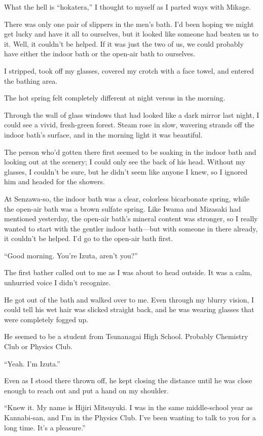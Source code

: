 \documentclass[
    a4paper,
    12pt,
    twoside,
    openany,
    UTF8,
    fontset=windows
]{ctexbook}
\begin{document}
What the hell is ``hokatera,'' I thought to myself as I parted ways with Mikage.

There was only one pair of slippers in the men's bath. I'd been hoping we might get lucky and have it all to ourselves, but it looked like someone had beaten us to it. Well, it couldn't be helped. If it was just the two of us, we could probably have either the indoor bath or the open-air bath to ourselves.

I stripped, took off my glasses, covered my crotch with a face towel, and entered the bathing area.

The hot spring felt completely different at night versus in the morning.

Through the wall of glass windows that had looked like a dark mirror last night, I could see a vivid, fresh-green forest. Steam rose in slow, wavering strands off the indoor bath's surface, and in the morning light it was beautiful.

The person who'd gotten there first seemed to be soaking in the indoor bath and looking out at the scenery; I could only see the back of his head. Without my glasses, I couldn't be sure, but he didn't seem like anyone I knew, so I ignored him and headed for the showers.

At Senzawa-so, the indoor bath was a clear, colorless bicarbonate spring, while the open-air bath was a brown sulfate spring. Like Iwama and Mizasaki had mentioned yesterday, the open-air bath's mineral content was stronger, so I really wanted to start with the gentler indoor bath---but with someone in there already, it couldn't be helped. I'd go to the open-air bath first.

``Good morning. You're Izuta, aren't you?''

The first bather called out to me as I was about to head outside. It was a calm, unhurried voice I didn't recognize.

He got out of the bath and walked over to me. Even through my blurry vision, I could tell his wet hair was slicked straight back, and he was wearing glasses that were completely fogged up.

He seemed to be a student from Tsunanagai High School. Probably Chemistry Club or Physics Club.

``Yeah. I'm Izuta.''

Even as I stood there thrown off, he kept closing the distance until he was close enough to reach out and put a hand on my shoulder.

``Knew it. My name is Hijiri Mitsuyuki. I was in the same middle-school year as Kannabi-san, and I'm in the Physics Club. I've been wanting to talk to you for a long time. It's a pleasure.''
\end{document}
